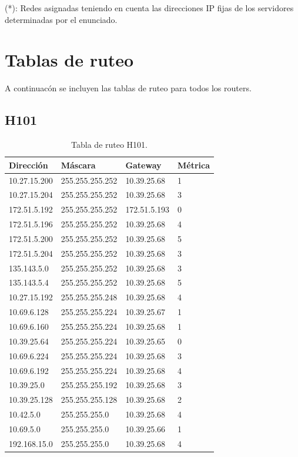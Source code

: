 \documentclass[12pt,titlepage]{article}
\begin{document}
(*): Redes asignadas teniendo en cuenta las direcciones IP fijas de los servidores determinadas por el enunciado. \\


\section{Tablas de ruteo}

A continuac\'on se incluyen las tablas de ruteo para todos los routers.

\subsection{H101}
\begin{table}
  \begin{center}
    \begin{tabular}{|l|l|l|l|}
      \hline
        \bf{Direcci\'on} & \bf{M\'ascara} & \bf{Gateway} & \bf{M\'etrica} \\
      \hline 
	10.27.15.200  & 255.255.255.252 & 10.39.25.68 & 1 \\
        10.27.15.204  & 255.255.255.252 & 10.39.25.68 & 3 \\
        172.51.5.192  & 255.255.255.252 & 172.51.5.193 & 0 \\
        172.51.5.196  & 255.255.255.252 & 10.39.25.68 & 4 \\
        172.51.5.200  & 255.255.255.252 & 10.39.25.68 & 5 \\
        172.51.5.204  & 255.255.255.252 & 10.39.25.68 & 3 \\
        135.143.5.0   & 255.255.255.252 & 10.39.25.68 & 3 \\
        135.143.5.4   & 255.255.255.252 & 10.39.25.68 & 5 \\ 	
	10.27.15.192  & 255.255.255.248 & 10.39.25.68 & 4 \\
	10.69.6.128   & 255.255.255.224 & 10.39.25.67 & 1 \\
        10.69.6.160   & 255.255.255.224 & 10.39.25.68 & 1 \\
	10.39.25.64   & 255.255.255.224 & 10.39.25.65 & 0 \\       
	10.69.6.224   & 255.255.255.224 & 10.39.25.68 & 3 \\
	10.69.6.192   & 255.255.255.224 & 10.39.25.68 & 4 \\	
	10.39.25.0    & 255.255.255.192 & 10.39.25.68 & 3 \\
	10.39.25.128  & 255.255.255.128 & 10.39.25.68 & 2 \\
	10.42.5.0     & 255.255.255.0 & 10.39.25.68 & 4 \\
        10.69.5.0     & 255.255.255.0 & 10.39.25.66 & 1 \\
        192.168.15.0  & 255.255.255.0 & 10.39.25.68 & 4 \\  
    \hline
    \end{tabular} \\
  \end{center}
  \caption{Tabla de ruteo H101.}
\end{table}
\newpage
\end{document}
